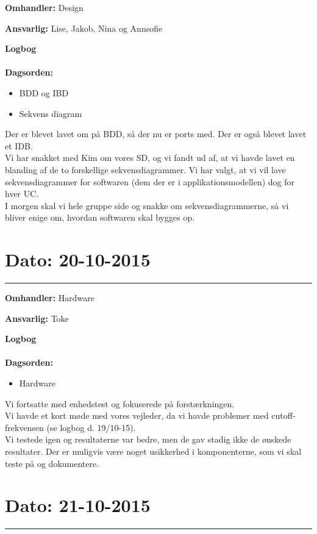 \textbf{Omhandler:} Design 

\textbf{Ansvarlig:} Lise, Jakob, Nina og Annsofie

\textbf{Logbog}
\\
\\
\textbf{Dagsorden:}
\begin{itemize}
	\item BDD og IBD
	\item Sekvens diagram
\end{itemize}

Der er blevet lavet om på BDD, så der nu er ports med. Der er også blevet lavet et IDB. 
\\
Vi har snakket med Kim om vores SD, og vi fandt ud af, at vi havde lavet en blanding af de to forskellige sekvensdiagrammer. Vi har valgt, at vi vil lave sekvensdiagrammer for softwaren (dem der er i applikationsmodellen) dog for hver UC.
\\
I morgen skal vi hele gruppe side og snakke om sekvensdiagrammerne, så vi bliver enige om, hvordan softwaren skal bygges op.  
	
	
	
	
\section{Dato: 20-10-2015 }
\hrule

\textbf{Omhandler:} Hardware

\textbf{Ansvarlig:} Toke

\textbf{Logbog}
\\
\\
\textbf{Dagsorden:}
\begin{itemize}
	\item Hardware
\end{itemize}
	
Vi fortsatte med enhedstest og fokuserede på forstærkningen. \\
Vi havde et kort møde med vores vejleder, da vi havde problemer med cutoff-frekvensen (se logbog d. 19/10-15). \\
Vi testede igen og resultaterne var bedre, men de gav stadig ikke de ønskede resultater. Der er muligvis være noget usikkerhed i komponenterne, som vi skal teste på og dokumentere. 
	
	
	
	
\section{Dato: 21-10-2015 }
\hrule

